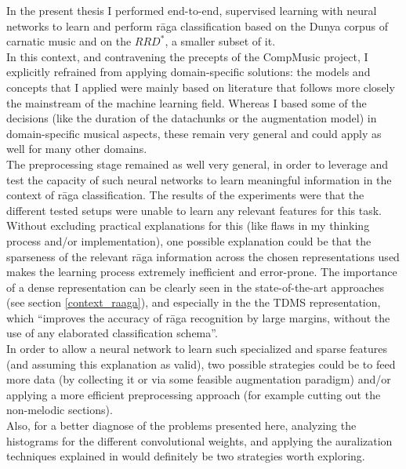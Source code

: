 In the present thesis I performed end-to-end, supervised learning with neural networks to learn and perform r\=aga classification based on the Dunya corpus of carnatic music and on the \(RRD^*\), a smaller subset of it.\\

In this context, and contravening the precepts of the CompMusic project, I explicitly refrained from applying domain-specific solutions: the models and concepts that I applied were mainly based on literature that follows more closely the mainstream of the machine learning field. Whereas I based some of the decisions (like the duration of the datachunks or the augmentation model) in domain-specific musical aspects, these remain very general and could apply as well for many other domains.\\

The preprocessing stage remained as well very general, in order to leverage and test the capacity of such neural networks to learn meaningful information in the context of r\=aga classification. The results of the experiments were that the different tested setups were unable to learn any relevant features for this task.\\

Without excluding practical explanations for this (like flaws in my thinking process and/or implementation), one possible explanation could be that the sparseness of the relevant r\=aga information across the chosen representations used makes the learning process extremely inefficient and error-prone. The importance of a dense representation can be clearly seen in the state-of-the-art approaches (see section \ref{context_raaga}), and especially in the  the TDMS representation, which ``improves the accuracy of r\=aga recognition by large margins, without the use of any elaborated classification schema''\cite[p.192]{gulati}.\\

In order to allow a neural network to learn such specialized and sparse features (and assuming this explanation as valid), two possible strategies could be to feed more data (by collecting it or via some feasible augmentation paradigm) and/or applying a more efficient preprocessing approach (for example cutting out the non-melodic sections).\\

Also, for a better diagnose of the problems presented here, analyzing the histograms for the different convolutional weights, and applying the auralization techniques explained in \cite{choi-explaining} would definitely be two strategies worth exploring.
